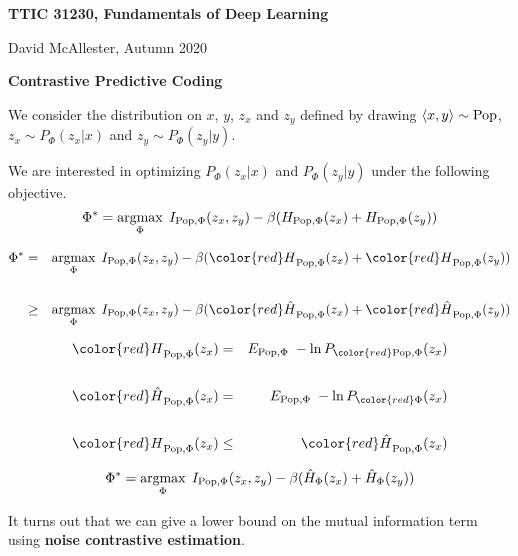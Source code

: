 





{\Huge
  \centerline{\bf TTIC 31230,  Fundamentals of Deep Learning}
  \vfill
  \centerline{David McAllester, Autumn   2020}
  \vfill
  \centerline{\bf Contrastive Predictive Coding}
  \vfill
  \vfill



We consider the distribution on $x$, $y$, $z_x$ and $z_y$ defined by drawing ${\mbox{$\langle x,y\rangle$}} \sim \mathrm{Pop}$, $z_x \sim P_\Phi(z_x|x)$ and $z_y \sim P_\Phi(z_y|y)$.

\vfill
We are interested in optimizing $P_\Phi(z_x|x)$ and $P_\Phi(z_y|y)$ under the following objective.
\vfill
$$\Phi^* = \operatorname*{argmax}_{\Phi} \; I_{\mathrm{Pop},\Phi}(z_x,z_y) - \beta (H_{\mathrm{Pop},\Phi}(z_x) + H_{\mathrm{Pop},\Phi}(z_y))$$


\begin{eqnarray*}
\Phi^* & = & \argmax_{\Phi} \; I_{\pop,\Phi}(z_x,z_y) - \beta ({\color{red} H}_{\pop,\Phi}(z_x) + {\color{red} H}_{\pop,\Phi}(z_y)) \\
\\
& \geq & \argmax_{\Phi} \; I_{\pop,\Phi}(z_x,z_y) - \beta ({\color{red} \hat{H}}_{\pop,\Phi}(z_x) + {\color{red} \hat{H}}_{\pop,\Phi}(z_y))
\end{eqnarray*}

\vfill
\begin{eqnarray*}
{\color{red} H}_{\pop,\Phi}(z_x) & = & E_{\pop,\Phi}\;-\ln P_{\color{red} \pop,\Phi}(z_x) \\
\\
{\color{red} \hat{H}}_{\pop,\Phi}(z_x) & = & E_{\pop,\Phi}\;-\ln P_{\color{red} \Phi}(z_x) \\
\\
{\color{red} H}_{\pop,\Phi}(z_x) & \leq & {\color{red} \hat{H}}_{\pop,\Phi}(z_x)
\end{eqnarray*}




$$\Phi^* = \operatorname*{argmax}_{\Phi} \; I_{\mathrm{Pop},\Phi}(z_x,z_y) - \beta (\hat{H}_\Phi(z_x) + \hat{H}_\Phi(z_y))$$

\vfill
It turns out that we can give a lower bound on the mutual information term using {\bf noise contrastive estimation}.


}
